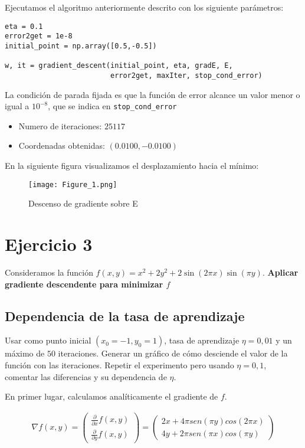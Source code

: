 Ejecutamos el algoritmo anteriormente descrito con los siguiente parámetros:

\begin{verbatim}
eta = 0.1 
error2get = 1e-8
initial_point = np.array([0.5,-0.5])

w, it = gradient_descent(initial_point, eta, gradE, E, 
                         error2get, maxIter, stop_cond_error)
\end{verbatim}

La condición de parada fijada es que la función de error alcance un valor
menor o igual a $10^{-8}$, que se indica en \texttt{stop_cond_error}

\begin{itemize}
\item Numero de iteraciones: $25117$
\item Coordenadas obtenidas: $(0.0100, -0.0100)$
\end{itemize}


En la siguiente figura visualizamos el desplazamiento hacia el mínimo: 

\begin{figure}[H]
\centering
\texttt{[image: Figure\_1.png]}
\caption{Descenso de gradiente sobre E}
\end{figure}

\section{Ejercicio 3}

Consideramos la función  $f(x,y) = x^2 + 2y^2 + 2 \sin (2 \pi x) \sin (\pi y)$.
\textbf{Aplicar gradiente descendente para minimizar $f$}

\subsection{Dependencia de la tasa de aprendizaje}

Usar como punto inicial $(x_0 = -1, y_0 = 1)$, tasa de aprendizaje $\eta = 0,01$
y un máximo de $50$ iteraciones. Generar un gráfico de cómo desciende el valor
de la función con las iteraciones. Repetir el experimento pero usando 
$\eta =0,1$, comentar las diferencias y su dependencia de $\eta$.  

En primer lugar, calculamos analíticamente el gradiente de $f$.

\begin{equation}
\begin{aligned}
  \nabla f(x,y) = \begin{pmatrix}
  \frac{\partial }{\partial x} f(x,y) \\
  \frac{\partial }{\partial y} f(x,y)
  \end{pmatrix} = \begin{pmatrix}
   2x + 4\pi sen(\pi y)cos(2\pi x) \\
   4y + 2\pi sen(\pi x)cos(\pi y)
  \end{pmatrix}
\end{aligned}
\end{equation}

